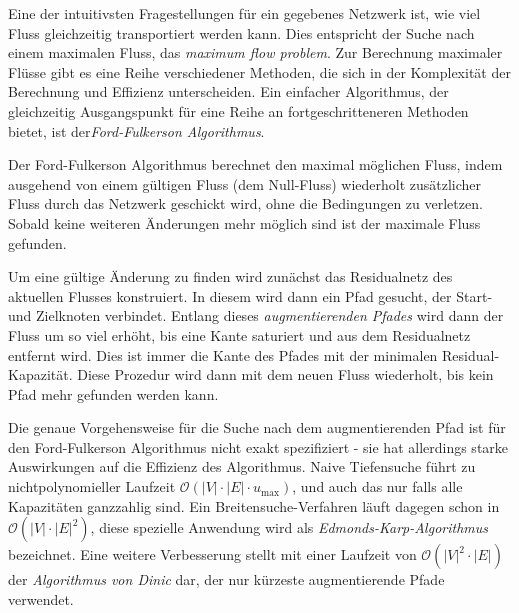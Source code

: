Eine der intuitivsten Fragestellungen für ein gegebenes Netzwerk ist, wie viel Fluss gleichzeitig transportiert werden kann. Dies entspricht der Suche nach einem maximalen Fluss, das \emph{maximum flow problem}. Zur Berechnung maximaler Flüsse gibt es eine Reihe verschiedener Methoden, die sich in der Komplexität der Berechnung und Effizienz unterscheiden. Ein einfacher Algorithmus, der gleichzeitig Ausgangspunkt für eine Reihe an fortgeschritteneren Methoden bietet, ist der\emph{Ford-Fulkerson Algorithmus}. \cite{Ford-Fulkerson_algo}

Der Ford-Fulkerson Algorithmus berechnet den maximal möglichen Fluss, indem ausgehend von einem gültigen Fluss (dem Null-Fluss) wiederholt zusätzlicher Fluss durch das Netzwerk geschickt wird, ohne die Bedingungen zu verletzen. Sobald keine weiteren Änderungen mehr möglich sind ist der maximale Fluss gefunden.

Um eine gültige Änderung zu finden wird zunächst das Residualnetz des aktuellen Flusses konstruiert. In diesem wird dann ein Pfad gesucht, der Start- und Zielknoten verbindet. Entlang dieses \emph{augmentierenden Pfades} wird dann der Fluss um so viel erhöht, bis eine Kante saturiert und aus dem Residualnetz entfernt wird. Dies ist immer die Kante des Pfades mit der minimalen Residual-Kapazität. Diese Prozedur wird dann mit dem neuen Fluss wiederholt, bis kein Pfad mehr gefunden werden kann.

Die genaue Vorgehensweise für die Suche nach dem augmentierenden Pfad ist für den Ford-Fulkerson Algorithmus nicht exakt spezifiziert - sie hat allerdings starke Auswirkungen auf die Effizienz des Algorithmus. Naive Tiefensuche führt zu nichtpolynomieller Laufzeit $\mathcal{O}\left(|V|\cdot |E|\cdot u_{\max}\right)$, und auch das nur falls alle Kapazitäten ganzzahlig sind. Ein Breitensuche-Verfahren läuft dagegen schon in $\mathcal{O}(|V| \cdot |E|^2)$, diese spezielle Anwendung wird als \emph{Edmonds-Karp-Algorithmus} bezeichnet. \cite{Edmonds_karp} Eine weitere Verbesserung stellt mit einer Laufzeit von $\mathcal{O}(|V|^2 \cdot |E|)$ der \emph{Algorithmus von Dinic} dar, der nur kürzeste augmentierende Pfade verwendet. \cite{dinic70}\cite{Dinic}

